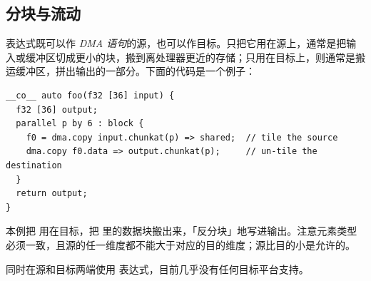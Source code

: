 \subsection*{分块与流动}

\co@chunkat@ 表达式既可以作 \emph{DMA 语句}的源，也可以作目标。只把它用在源上，通常是把输入或缓冲区切成更小的块，搬到离处理器更近的存储；只用在目标上，则通常是搬运缓冲区，拼出输出的一部分。下面的代码是一个例子：

\begin{lstlisting}[language=croqtile,caption={分块与流动}]
__co__ auto foo(f32 [36] input) {
  f32 [36] output;
  parallel p by 6 : block {
    f0 = dma.copy input.chunkat(p) => shared;  // tile the source
    dma.copy f0.data => output.chunkat(p);     // un-tile the destination
  }
  return output;
}
\end{lstlisting}

本例把 \co@chunkat@ 用在目标，把 \co@shared@ 里的数据块搬出来，「反分块」地写进输出。注意元素类型必须一致，且源的任一维度都不能大于对应的目的维度；源比目的小是允许的。

同时在源和目标两端使用 \co@chunkat@ 表达式，目前几乎没有任何目标平台支持。
